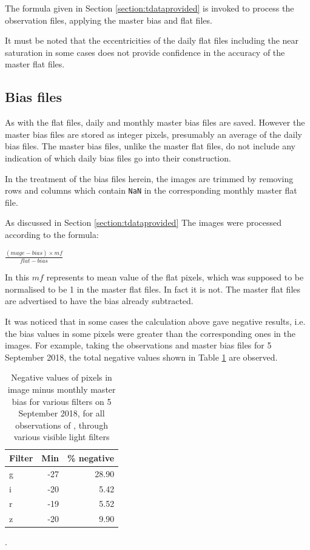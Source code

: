 The formula given in Section \ref{section:tdataprovided} is invoked to process
the observation files, applying the master bias and flat files.

It must be noted that the eccentricities of the daily flat files including the
near saturation in some cases does not provide confidence in the accuracy of the
master flat files.

\clearpage

\subsection{Bias files}
\protect\label{section:biasfiles}

As with the flat files, daily and monthly master bias files are saved. However
the master bias files are stored as integer pixels, presumably an average of the
daily bias files. The master bias files, unlike the master flat files, do not
include any indication of which daily bias files go into their construction.

In the treatment of the bias files herein, the images are trimmed by removing
rows and columns which contain \texttt{NaN} in the corresponding monthly master
flat file.

As discussed in Section \ref{section:tdataprovided} The images were processed according to the formula:

\begin{center}
$ \frac{(mage - bias) \times mf}{flat - bias}$
\end{center}

In this $mf$ represents to mean value of the flat pixels, which was supposed to
be normalised to be 1 in the master flat files. In fact it is not. The master
flat files are advertised to have the bias already subtracted.

It was noticed that in some cases the calculation above gave negative results,
i.e. the bias values in some pixels were greater than the corresponding ones in
the images. For example, taking the observations and master bias files for 5
September 2018, the total negative values shown in Table \ref{table:negmast} are
observed.

\begin{table}[!htbp]
\begin{center}
\begin{tabular}{lrr} \hline
Filter & Min & \% negative \\\hline
g & -27 & 28.90 \\
i & -20 & 5.42 \\
r & -19 & 5.52 \\
z & -20 & 9.90 \\
\hline
\end{tabular}
\end{center}
\caption{Negative values of pixels in image minus monthly master bias for
various filters on 5 September 2018, for all observations of \bstar, through
various visible light filters}.
\protect\label{table:negmast}
\end{table}

